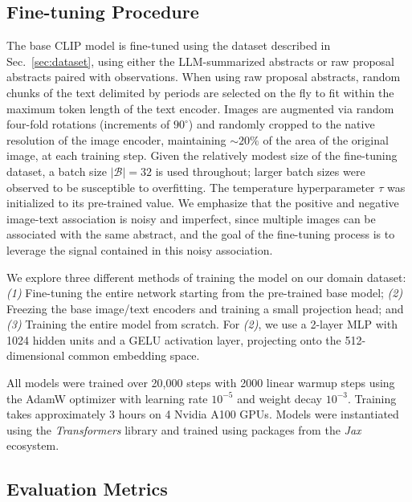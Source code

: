 \documentclass[10pt]{article} %
\newcommand{\package}[1]{\textsl{#1}\xspace}
\begin{document}
\subsection{Fine-tuning Procedure}

The base CLIP model is fine-tuned using the dataset described in Sec.~\ref{sec:dataset}, using either the LLM-summarized abstracts or raw proposal abstracts paired with observations.
%
When using raw proposal abstracts, random chunks of the text delimited by periods are selected on the fly to fit within the maximum token length of the text encoder.
%
Images are augmented via random four-fold rotations (increments of $90^\circ$) and randomly cropped to the native resolution of the image encoder, maintaining $\sim 20\%$ of the area of the original image, at each training step.
%
Given the relatively modest size of the fine-tuning dataset, a batch size $|\mathcal B| = 32$ is used throughout; larger batch sizes were observed to be susceptible to overfitting.
%
The temperature hyperparameter $\tau$ was initialized to its pre-trained value.
%
We emphasize that the positive and negative image-text association is noisy and imperfect, since multiple images can be associated with the same abstract, and the goal of the fine-tuning process is to leverage the signal contained in this noisy association. 

We explore three different methods of training the model on our domain dataset: \emph{(1)} Fine-tuning the entire network starting from the pre-trained base model; \emph{(2)} Freezing the base image/text encoders and training a small projection head; and \emph{(3)} Training the entire model from scratch.
%
For \emph{(2)}, we use a 2-layer MLP with 1024 hidden units and a GELU activation layer, projecting onto the 512-dimensional common embedding space.

All models were trained over 20,000 steps with 2000 linear warmup steps 
using the AdamW optimizer \citep{DBLP:conf/iclr/LoshchilovH19,DBLP:journals/corr/KingmaB14} with  %
learning rate $10^{-5}$ and weight decay $10^{-3}$.
%
Training takes approximately 3 hours on 4 Nvidia A100 GPUs.
Models were instantiated using the \package{Transformers} \citep{wolf2019huggingface} library and trained using packages from the \package{Jax} \citep{jax2018github} ecosystem.
%


\subsection{Evaluation Metrics}
\label{sec:eval}
\end{document}
